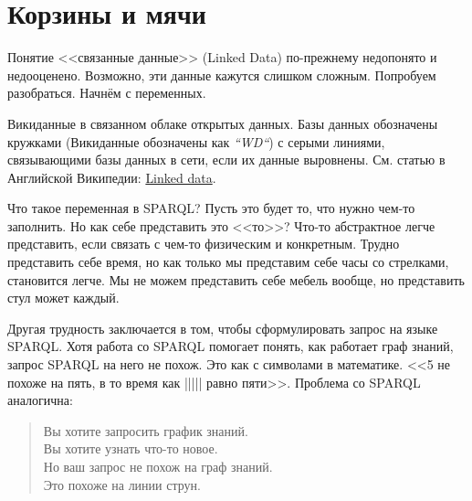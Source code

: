 \chapter{Корзины и мячи}
\label{ch:BucketsAndBalls}

Понятие <<связанные данные>> (Linked Data) по-прежнему недопонято и недооценено. Возможно, эти данные кажутся слишком сложным. 
Попробуем разобраться. Начнём с переменных.

\begin{marginfigure}[-1.0cm]
	{
		\setlength{\fboxsep}{0pt}%
		\setlength{\fboxrule}{1pt}%
	}
    \caption{Викиданные в связанном облаке открытых данных. Базы данных обозначены кружками (Викиданные обозначены как \textit{``WD``}) с серыми линиями, связывающими базы данных в сети, если их данные выровнены. См. статью в Английской Википедии: \href{https://en.wikipedia.org/wiki/Linked_data}{Linked data}.}
	\label{fig:Wikidata_in_linked_open_data}
\end{marginfigure}

Что такое переменная в SPARQL? Пусть это будет то, что нужно чем-то заполнить. Но как себе представить это <<то>>? Что-то абстрактное легче представить, если связать с чем-то физическим и конкретным. Трудно представить себе время, но как только мы представим себе часы со стрелками, становится легче. Мы не можем представить себе мебель вообще, но представить стул может каждый.

Другая трудность заключается в том, чтобы сформулировать запрос на языке SPARQL. Хотя работа со SPARQL помогает понять, как работает граф знаний\footnotemark {}, запрос SPARQL на него не похож. Это как с символами в математике. <<5 не похоже на пять, в то время как ||||| равно пяти>>. Проблема со SPARQL аналогична:

\begin{quote}
Вы хотите запросить график знаний.\\
Вы хотите узнать что-то новое.\\
Но ваш запрос не похож на граф знаний.\\
Это похоже на линии струн.\\
\end{quote}

